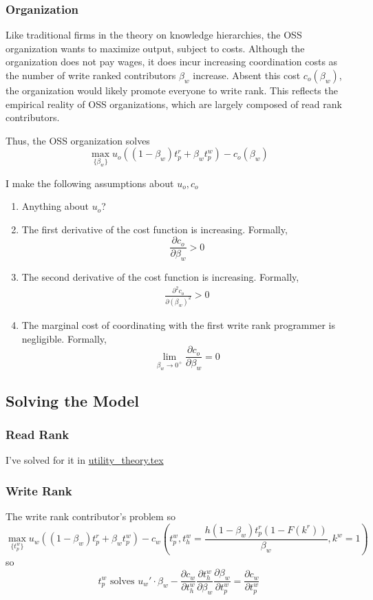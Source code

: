 \documentclass[source/paper/main.tex]{subfiles}
\begin{document}
\subsubsection{Organization}
Like traditional firms in the theory on knowledge hierarchies, the OSS organization wants to maximize output, subject to costs. Although the organization does not pay wages, it does incur increasing coordination costs as the number of write ranked contributors $\beta_w$ increase. Absent this cost $c_o(\beta_w)$, the organization would likely promote everyone to write rank. This reflects the empirical reality of OSS organizations, which are largely composed of read rank contributors. 

Thus, the OSS organization solves
$$\max_{\{\beta_w\}} u_o\left((1-\beta_w) t_p^r + \beta_w t_p^w\right) - c_o(\beta_w)$$ 

I make the following assumptions about $u_o, c_o$
\begin{enumerate}
    \item Anything about $u_o$?
    \item The first derivative of the cost function is increasing. Formally, 
    $$\frac{\partial c_o}{\partial \beta_w}>0$$
    \item  The second derivative of the cost function is increasing. Formally, 
    \begin{align}
        \frac{\partial^2 c_o}{\partial (\beta_w)^2}>0 \label{org_concave_cost}
    \end{align}
    \item The marginal cost of coordinating with the first write rank programmer is negligible. Formally,
    $$\lim_{\beta_w \to 0^+} \frac{\partial c_o}{\partial \beta_w} = 0 $$
\end{enumerate}

\subsection{Solving the Model}
\subsubsection{Read Rank}
I've solved for it in \href{run:source/paper/utility_theory.tex}{utility\_theory.tex}

\subsubsection{Write Rank}
The write rank contributor's problem so
$$\max_{\{t_p^w\}} u_w\left((1-\beta_w) t_p^r + \beta_w t_p^w \right) - c_w\left(t_p^w, t_h^w = \frac{ h (1-\beta_w) t_p^r(1-F(k^r))}{\beta_w}, k^w = 1\right)$$
so $$t_p^w \text{ solves } u_w' \cdot \beta_w - \frac{\partial c_w}{\partial t_h^w} \frac{\partial t_h^w}{\partial \beta_w}\frac{\partial \beta_w}{\partial t_p^w} = \frac{\partial c_w}{\partial t_p^w} $$
\end{document}
